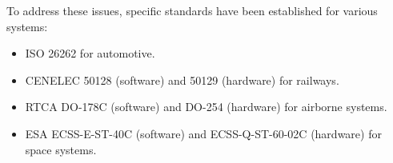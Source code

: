 To address these issues, specific standards have been established for various systems:
\begin{itemize}
    \item ISO 26262 for automotive.
    \item CENELEC 50128 (software) and 50129 (hardware) for railways.
    \item RTCA DO-178C (software) and DO-254 (hardware) for airborne systems.
    \item ESA ECSS-E-ST-40C (software) and ECSS-Q-ST-60-02C (hardware) for space systems.
\end{itemize}